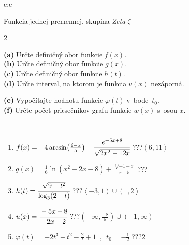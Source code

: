 \documentclass[10pt]{report}
\begin{document}
\begin{tabular}{c:c}
\begin{minipage}[c][104.5mm][t]{0.5\linewidth}
\begin{center}
\vspace{7mm}
{\huge Funkcia jednej premennej, skupina \textit{Zeta $\zeta$} -}\\[5mm]
\begin{minipage}{0.95\linewidth}
\begin{center}
{\small \begin{multicols}{2} \raggedright
\textbf{(a)} Určte definičný obor funkcie \(f(x)\). \\[1mm]
\textbf{(b)} Určte definičný obor funkcie \(g(x)\). \\[1mm]
\textbf{(c)} Určte definičný obor funkcie \(h(t)\). \\[1mm]
\textbf{(d)} Určte interval, na ktorom je funkcia \(u(x)\) nezáporná. \par \columnbreak
\textbf{(e)} Vypočítajte hodnotu funkcie \(\varphi(t)\) v~bode~\(t_0\). \\[1mm]
\textbf{(f)} Určte počet priesečníkov grafu funkcie \(w(x)\) s~osou \(x\). \\[1mm]
\end{multicols}
}
\end{center}
\end{minipage}
\\[4mm]
\begin{minipage}{0.79\linewidth}
\begin{center}
\begin{varwidth}{\linewidth}
\begin{enumerate}
\small
\item $f(x) = -4\arcsin\!\left( \frac{6-x}{5} \right) - \cfrac{e^{-5x+8}}{\sqrt{2x^2-12x}}$\quad \dotfill\; ???\;\dotfill \quad $\left(6 , 11\right\rangle$
\item $g(x) = \frac{1}{6} \ln{\!(x^2-2x-8)}+\frac{\sqrt[3]{-1-x}}{x-5}$\quad \dotfill\; ???\;\dotfill {}
\item $h(t) = \cfrac{\sqrt{9-t^2}}{\log_3(2-t)}$\quad \dotfill\; ???\;\dotfill \quad $\left\langle-3 , 1\right)\cup\left(1 , 2\right\rangle$
\item $u(x) = \cfrac{-5x-8}{-2x-2}$\quad \dotfill\; ???\;\dotfill \quad $\left(-\infty , \frac{-8}{5}\right)\cup\left(-1 , \infty\right)$
\item $\varphi(t) = -2t^3-t^2-\frac{2}{t}+1 \enspace , \enspace t_0=-\frac{1}{2}$\quad \dotfill\; ???\;\dotfill \quad $2$

\end{enumerate}
\end{varwidth}
\end{center}
\end{minipage}
\end{center}
\end{minipage}
\end{tabular}
\end{document}
